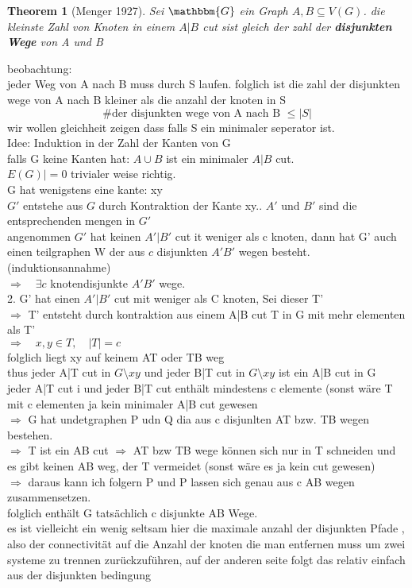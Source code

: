 \documentclass[a4paper]{article}
\newtheorem{theorem}{Theorem}[section]
\theoremstyle{definition}
\theoremstyle{remark}
\begin{document}
\begin{theorem}
  [Menger 1927]
  Sei $\mathbbm{G}$ ein Graph $A,B \subseteq V(G)$. die kleinste Zahl von Knoten in einem $A|B$ cut sist gleich der zahl der \textbf{disjunkten Wege} von A und B
\end{theorem}
beobachtung:\\
jeder Weg von A nach B muss durch S laufen. folglich ist die zahl der disjunkten wege von A nach B kleiner als die anzahl der knoten in S
\begin{equation*}
  \textrm{\# der disjunkten wege von A nach B }\leq |S|
\end{equation*}
wir wollen gleichheit zeigen dass falls S ein minimaler seperator ist.\\
Idee: Induktion in der Zahl der Kanten von G\\
falls G keine Kanten hat: $A\cup B$ ist ein minimaler $A|B$ cut. \\
$E(G)|=0$ trivialer weise richtig.\\
G hat wenigstens eine kante: xy\\
$G'$ entstehe aus $G$ durch Kontraktion der Kante xy.. $A'$ und $B'$ sind die entsprechenden mengen in $G'$\\
angenommen $G'$ hat keinen $A'|B'$ cut it weniger als c knoten, dann hat G' auch einen teilgraphen W der aus $c$ disjunkten $A'B'$ wegen besteht. (induktionsannahme) \\
$\Rightarrow \quad \exists  c$ knotendisjunkte $A'B'$ wege.\\
2. G' hat einen $A'|B'$ cut mit weniger als C knoten, Sei dieser T'\\
$\Rightarrow$ T' entsteht durch kontraktion aus einem A|B cut  T in G mit mehr elementen als T'\\
$\Rightarrow \quad x,y\in T, \quad |T|=c$ \\
folglich liegt xy auf keinem AT oder TB weg\\
thus jeder A|T cut in $G\setminus xy$ und jeder B|T cut in $G\setminus xy$ ist ein A|B cut in G\\
jeder A|T cut i und jeder B|T cut enthält mindestens c elemente (sonst wäre T mit c elementen ja kein minimaler A|B cut gewesen\\
  $\Rightarrow$ G hat undetgraphen P udn Q dia aus c disjunlten AT bzw.  TB wegen bestehen.\\
  $\Rightarrow$ T ist ein AB cut  $ \Rightarrow$ AT bzw TB wege können sich nur in T schneiden und es gibt keinen AB weg, der T vermeidet (sonst wäre es ja kein cut gewesen)\\
  $ \Rightarrow$ daraus kann ich folgern P und P lassen sich genau aus c AB wegen zusammensetzen.\\
  folglich enthält G tatsächlich c disjunkte AB Wege.\\
  es ist vielleicht ein wenig seltsam hier die maximale anzahl der disjunkten Pfade , also der connectivität auf die Anzahl der knoten die man entfernen muss um zwei systeme zu trennen zurückzuführen, auf der anderen seite folgt das relativ einfach aus der disjunkten bedingung
\end{document}
